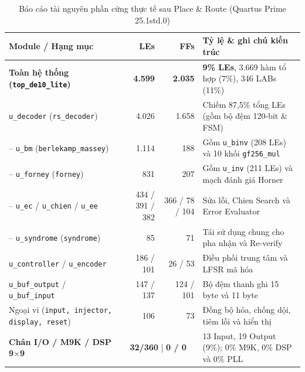 \documentclass[11pt,a4paper]{report}
\begin{document}
\begin{table}[!htb]
    \centering
    \caption{Báo cáo tài nguyên phần cứng thực tế sau Place \& Route (Quartus Prime 25.1std.0)}
    \label{tab:quartus-res}
    \scriptsize
    \setlength{\tabcolsep}{3pt}
    \renewcommand{\arraystretch}{1.02}
    \begin{tabularx}{\textwidth}{l r r >{\raggedright\arraybackslash}X}
        \toprule
        \textbf{Module / Hạng mục} & \textbf{LEs} & \textbf{FFs} & \textbf{Tỷ lệ \& ghi chú kiến trúc} \\
        \midrule
        \textbf{Toàn hệ thống (\texttt{top\_de10\_lite})} & \textbf{4.599} & \textbf{2.035} & \textbf{9\% LEs}, 3.669 hàm tổ hợp (7\%), 346 LABs (11\%) \\
        \quad \texttt{u\_decoder} (\texttt{rs\_decoder}) & 4.026 & 1.658 & Chiếm 87,5\% tổng LEs (gồm bộ đệm 120-bit \& FSM) \\
        \qquad -- \texttt{u\_bm} (\texttt{berlekamp\_massey}) & 1.114 & 188 & Gồm \texttt{u\_binv} (208 LEs) và 10 khối \texttt{gf256\_mul} \\
        \qquad -- \texttt{u\_forney} (\texttt{forney}) & 831 & 207 & Gồm \texttt{u\_inv} (211 LEs) và mạch đánh giá Horner \\
        \qquad -- \texttt{u\_ec} / \texttt{u\_chien} / \texttt{u\_ee} & 434 / 391 / 382 & 366 / 78 / 104 & Sửa lỗi, Chien Search và Error Evaluator \\
        \qquad -- \texttt{u\_syndrome} (\texttt{syndrome}) & 85 & 71 & Tái sử dụng chung cho pha nhận và Re-verify \\
        \quad \texttt{u\_controller} / \texttt{u\_encoder} & 186 / 101 & 26 / 53 & Điều phối trung tâm và LFSR mã hóa \\
        \quad \texttt{u\_buf\_output} / \texttt{u\_buf\_input} & 147 / 137 & 124 / 101 & Bộ đệm thanh ghi 15 byte và 11 byte \\
        \quad Ngoại vi (\texttt{input, injector, display, reset}) & 106 & 73 & Đồng bộ hóa, chống dội, tiêm lỗi và hiển thị \\
        \midrule
        \textbf{Chân I/O / M9K / DSP 9$\times$9} & \multicolumn{2}{c}{\textbf{32/360} \quad | \quad \textbf{0 / 0}} & 13 Input, 19 Output (9\%); 0\% M9K, 0\% DSP và 0\% PLL \\
        \bottomrule
    \end{tabularx}
\end{table}
\end{document}
